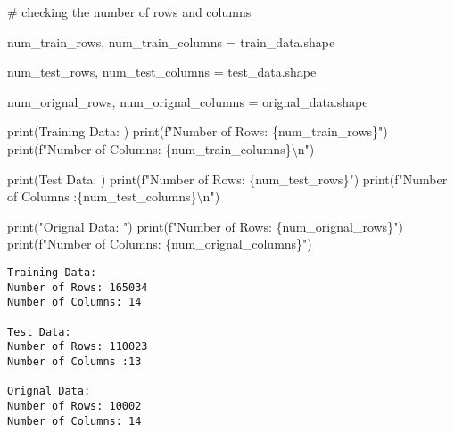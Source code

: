 \documentclass[
  letterpaper,
  DIV=11,
  numbers=noendperiod]{scrartcl}
\newenvironment{Shaded}{\begin{snugshade}}{\end{snugshade}}
\newcommand{\BuiltInTok}[1]{\textcolor[rgb]{0.00,0.23,0.31}{#1}}
\newcommand{\CharTok}[1]{\textcolor[rgb]{0.13,0.47,0.30}{#1}}
\newcommand{\CommentTok}[1]{\textcolor[rgb]{0.37,0.37,0.37}{#1}}
\newcommand{\NormalTok}[1]{\textcolor[rgb]{0.00,0.23,0.31}{#1}}
\newcommand{\OperatorTok}[1]{\textcolor[rgb]{0.37,0.37,0.37}{#1}}
\newcommand{\SpecialCharTok}[1]{\textcolor[rgb]{0.37,0.37,0.37}{#1}}
\newcommand{\SpecialStringTok}[1]{\textcolor[rgb]{0.13,0.47,0.30}{#1}}
\newcommand{\StringTok}[1]{\textcolor[rgb]{0.13,0.47,0.30}{#1}}
\begin{document}
\begin{Shaded}
\begin{Highlighting}[]
\CommentTok{\# checking the number of rows and columns}

\NormalTok{num\_train\_rows, num\_train\_columns }\OperatorTok{=}\NormalTok{ train\_data.shape}

\NormalTok{num\_test\_rows, num\_test\_columns }\OperatorTok{=}\NormalTok{ test\_data.shape}

\NormalTok{num\_orignal\_rows, num\_orignal\_columns }\OperatorTok{=}\NormalTok{ orignal\_data.shape}

\BuiltInTok{print}\NormalTok{(}\StringTok{\textquotesingle{}Training Data: \textquotesingle{}}\NormalTok{)}
\BuiltInTok{print}\NormalTok{(}\SpecialStringTok{f"Number of Rows: }\SpecialCharTok{\{}\NormalTok{num\_train\_rows}\SpecialCharTok{\}}\SpecialStringTok{"}\NormalTok{)}
\BuiltInTok{print}\NormalTok{(}\SpecialStringTok{f"Number of Columns: }\SpecialCharTok{\{}\NormalTok{num\_train\_columns}\SpecialCharTok{\}}\CharTok{\textbackslash{}n}\SpecialStringTok{"}\NormalTok{)}

\BuiltInTok{print}\NormalTok{(}\StringTok{\textquotesingle{}Test Data: \textquotesingle{}}\NormalTok{)}
\BuiltInTok{print}\NormalTok{(}\SpecialStringTok{f"Number of Rows: }\SpecialCharTok{\{}\NormalTok{num\_test\_rows}\SpecialCharTok{\}}\SpecialStringTok{"}\NormalTok{)}
\BuiltInTok{print}\NormalTok{(}\SpecialStringTok{f"Number of Columns :}\SpecialCharTok{\{}\NormalTok{num\_test\_columns}\SpecialCharTok{\}}\CharTok{\textbackslash{}n}\SpecialStringTok{"}\NormalTok{)}

\BuiltInTok{print}\NormalTok{(}\StringTok{"Orignal Data: "}\NormalTok{)}
\BuiltInTok{print}\NormalTok{(}\SpecialStringTok{f"Number of Rows: }\SpecialCharTok{\{}\NormalTok{num\_orignal\_rows}\SpecialCharTok{\}}\SpecialStringTok{"}\NormalTok{)}
\BuiltInTok{print}\NormalTok{(}\SpecialStringTok{f"Number of Columns: }\SpecialCharTok{\{}\NormalTok{num\_orignal\_columns}\SpecialCharTok{\}}\SpecialStringTok{"}\NormalTok{)}

\end{Highlighting}
\end{Shaded}

\begin{verbatim}
Training Data: 
Number of Rows: 165034
Number of Columns: 14

Test Data: 
Number of Rows: 110023
Number of Columns :13

Orignal Data: 
Number of Rows: 10002
Number of Columns: 14
\end{verbatim}
\end{document}
